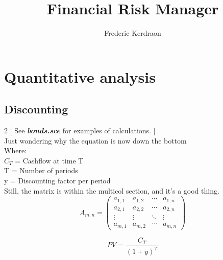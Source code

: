 \documentclass[11pt]{article} %
\title{Financial Risk Manager}
\author{Frederic Kerdraon}
\begin{document}
\maketitle

\section{Quantitative analysis}

\subsection{Discounting}

\begin{multicols*}{2}
[
See \textbf{\textit{bonds.sce}} for examples of calculations.
]
\\

Just wondering why the equation is now down the bottom\\

Where:\\
$C_T$ = Cashflow at time T\\
T = Number of periods\\ 
y = Discounting factor per period\\

Still, the matrix is within the multicol section, and it's a good thing.\\
\begin{equation*}
A_{m,n} = 
\begin{pmatrix}
a_{1,1} & a_{1,2} & \cdots & a_{1,n} \\
a_{2,1} & a_{2,2} & \cdots & a_{2,n} \\
\vdots  & \vdots  & \ddots & \vdots  \\
a_{m,1} & a_{m,2} & \cdots & a_{m,n} 
\end{pmatrix}
\end{equation*}


\begin{equation}
PV = \frac{C_T}{(1+y)^T}
\label{moneq}
\end{equation}


\end{multicols*}
\end{document}
